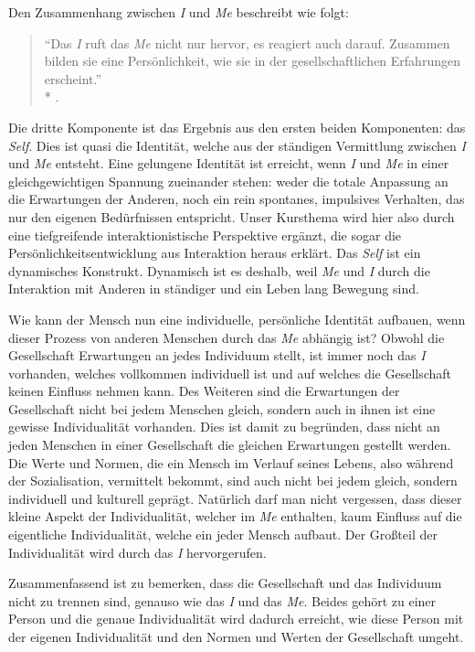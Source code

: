 Den Zusammenhang zwischen \emph{I} und \emph{Me} beschreibt \citeauthor{mead-1934en} wie folgt:

\begin{quote}
	``Das \emph{I} ruft das \emph{Me} nicht nur hervor, es reagiert auch darauf.
	Zusammen bilden sie eine Persönlichkeit, wie sie in der gesellschaftlichen Erfahrungen erscheint.''\\*
	\textcite[221]{mead-1934en}.
\end{quote}

Die dritte Komponente ist das Ergebnis aus den ersten beiden Komponenten: das \emph{Self}.
Dies ist quasi die Identität, welche aus der ständigen Vermittlung zwischen \emph{I} und \emph{Me} entsteht.
Eine gelungene Identität ist erreicht, wenn \emph{I} und \emph{Me} in einer gleichgewichtigen Spannung zueinander stehen:
weder die totale Anpassung an die Erwartungen der Anderen, noch ein rein spontanes, impulsives Verhalten, das nur den eigenen Bedürfnissen entspricht.
Unser Kursthema wird hier also durch eine tiefgreifende interaktionistische Perspektive ergänzt, die sogar die Persönlichkeitsentwicklung aus Interaktion heraus erklärt.
Das \emph{Self} ist ein dynamisches Konstrukt.
Dynamisch ist es deshalb, weil \emph{Me} und \emph{I} durch die Interaktion mit Anderen in ständiger und ein Leben lang Bewegung sind.

Wie kann der Mensch nun eine individuelle, persönliche Identität aufbauen, wenn dieser Prozess von anderen Menschen durch das \emph{Me} abhängig ist?
Obwohl die Gesellschaft Erwartungen an jedes Individuum stellt, ist immer noch das \emph{I} vorhanden, welches vollkommen individuell ist und auf welches die Gesellschaft keinen Einfluss nehmen kann.
Des Weiteren sind die Erwartungen der Gesellschaft nicht bei jedem Menschen gleich, sondern auch in ihnen ist eine gewisse Individualität vorhanden.
Dies ist damit zu begründen, dass nicht an jeden Menschen in einer Gesellschaft die gleichen Erwartungen gestellt werden.
Die Werte und Normen, die ein Mensch im Verlauf seines Lebens, also während der Sozialisation, vermittelt bekommt, sind auch nicht bei jedem gleich, sondern individuell und kulturell geprägt.
Natürlich darf man nicht vergessen, dass dieser kleine Aspekt der Individualität, welcher im \emph{Me} enthalten, kaum Einfluss auf die eigentliche Individualität, welche ein jeder Mensch aufbaut.
Der Großteil der Individualität wird durch das \emph{I} hervorgerufen.

Zusammenfassend ist zu bemerken, dass die Gesellschaft und das Individuum nicht zu trennen sind, genauso wie das \emph{I} und das \emph{Me}.
Beides gehört zu einer Person und die genaue Individualität wird dadurch erreicht, wie diese Person mit der eigenen Individualität und den Normen und Werten der Gesellschaft umgeht.
